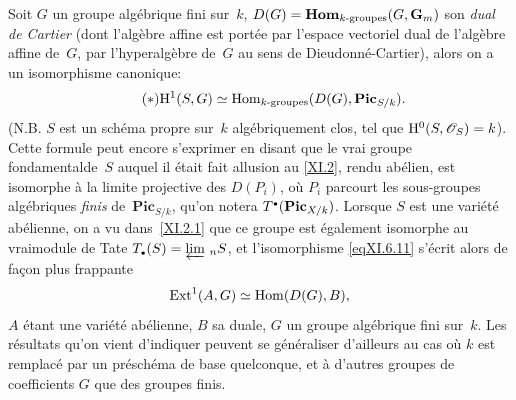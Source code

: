 \begin{remarques}
Soit $G$ un groupe alg\'ebrique fini sur~$k$,
$D(G)=\operatorname{\mathbf{Hom}}_{k\textup{-groupes}}(G,\mathbf{G}_m)$ son \emph{dual de
Cartier} (dont l'alg\`ebre affine est port\'ee par l'espace
vectoriel dual de l'alg\`ebre affine de~$G$, \ie par
l'hyperalg\`ebre de~$G$ au sens de Dieudonn\'e-Cartier), alors on
a un isomorphisme canonique:
\begin{equation}\label{eqXI.6.11}\tag{$*$}
\mathrm{H}^1(S,G)\simeq\operatorname{Hom}_{k\textup{-groupes}}(D(G),\mathbf{Pic}_{S/k}).
\end{equation}
(N.B. $S$ est un sch\'ema propre sur~$k$ alg\'ebriquement clos, tel
que $\H^0(S,\cal{O}_S)=k$). Cette formule peut encore s'exprimer en
disant que le \og vrai groupe fondamental\fg de~$S$ auquel il \'etait
fait allusion au \No \ref{XI.2}, rendu ab\'elien, est isomorphe \`a la
limite projective des $D(P_i)$, o\`u $P_i$ parcourt les sous-groupes
alg\'ebriques \emph{finis} de~$\mathbf{Pic}_{S/k}$, qu'on notera
$T^{\scriptscriptstyle\bullet}(\mathbf{Pic}_{X/k})$. Lorsque $S$ est une vari\'et\'e
ab\'elienne, on a vu dans~\ref{XI.2.1} que ce groupe est
\'egalement isomorphe au \og vrai\fg module de Tate
$T_{{\scriptscriptstyle\bullet}}(S)=\varprojlim\, {{_n}S}$, et l'isomorphisme
\eqref{eqXI.6.11} s'\'ecrit alors de fa\c con plus frappante
$$
\operatorname{Ext}^1(A,G)\simeq\operatorname{Hom}(D(G),B),
$$
$A$ \'etant une vari\'et\'e ab\'elienne, $B$ sa duale, $G$ un
groupe alg\'ebrique fini sur~$k$. Les r\'esultats qu'on vient
d'indiquer peuvent se g\'en\'eraliser d'ailleurs au cas o\`u $k$
est remplac\'e par un pr\'esch\'ema de base quelconque, et \`a
d'autres groupes de coefficients $G$ que des groupes finis.
\end{remarques}


